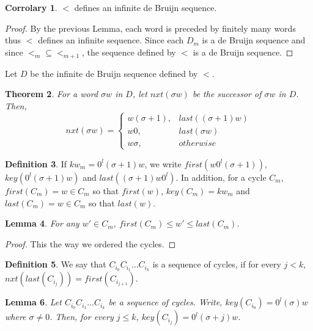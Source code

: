 \documentclass{article}
\newtheorem{theorem}{Theorem}
\newtheorem{lemma}[theorem]{Lemma}
\theoremstyle{definition}
\newtheorem{definition}[theorem]{Definition}
\newtheorem{corrolary}[theorem]{Corrolary}
\begin{document}
\begin{corrolary}
	$<$ defines an infinite de Bruijn sequence.
\end{corrolary}

\begin{proof}
	By the previous Lemma, each word is preceded by finitely many words thus $<$ defines an infinite sequence. Since each $D_m$ is a de Bruijn sequence and since $<_m\subseteq<_{m+1}$, the sequence defined by $<$ is a de Bruijn sequence. 
\end{proof}

Let $D$ be the infinite de Bruijn sequence defined by $<$. 

\begin{theorem}
	For a  word $\sigma w$ in $D$, let $nxt(\sigma w)$ be the successor of $\sigma w$ in $D$. Then,
	$$nxt(\sigma w)=\left\{ \begin{array}{lr}
	w(\sigma+1), & last((\sigma+1)w)\\
	w0, & last(\sigma w)\\
	w\sigma, & otherwise
	\end{array}\right.$$
\end{theorem}

\begin{definition}
	If $kw_m=0^l(\sigma+1)w$, we write $first(w0^l(\sigma+1))$, $key(0^l(\sigma+1)w)$ and $last((\sigma+1)w0^l)$. In addition, for a cycle $C_m$, $first(C_m)=w\in C_m$ so that $first(w)$,  $key(C_m)=kw_m$ and $last(C_m)=w\in C_m$ so that $last(w)$. 
\end{definition}

\begin{lemma}
	For any $w'\in C_m$, $first(C_m)\leq w'\leq last(C_m)$.
\end{lemma}
\begin{proof}
	This the way we ordered the cycles.
\end{proof}



\begin{definition}
	We say that $C_{i_0}C_{i_1}\dots C_{i_k}$ is a sequence of cycles, if for every $j<k$, $nxt(last(C_{i_j}))=first(C_{i_{j+1}})$.
\end{definition}

\begin{lemma}
	\label{sequence}
	Let $C_{i_0}C_{i_1}\dots C_{i_k}$ be a sequence of cycles. Write, $key(C_{i_0})=0^l(\sigma)w$ where $\sigma\neq 0$. Then, for every $j\leq k$, $key(C_{i_j})=0^l(\sigma+j)w$.
\end{lemma}
\end{document}
